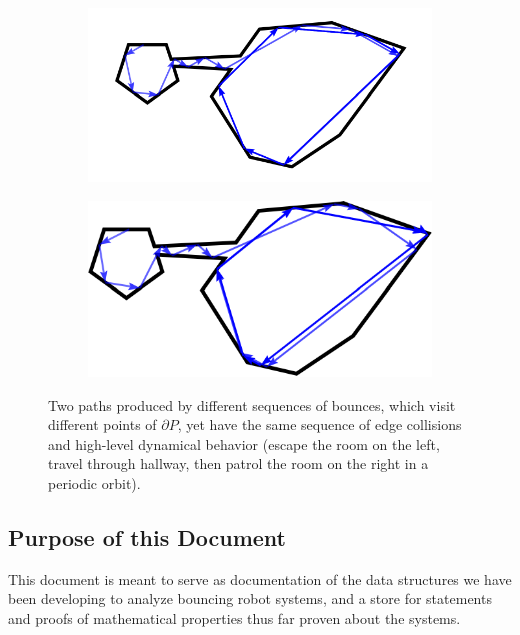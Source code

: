 \documentclass[sageh,times,Review]{sagej}
\begin{document}
\begin{figure}
\centering
\begin{subfigure}{0.5\columnwidth}
\includegraphics[width=\linewidth]{twoc_a_new.pdf}
\end{subfigure}%
\begin{subfigure}{0.5\columnwidth}
\includegraphics[width=\linewidth]{twoc_b}
\end{subfigure}
\caption{Two paths produced by different sequences of bounces, which visit
different points of $\partial P$, yet have the same sequence of edge collisions 
and high-level dynamical behavior (escape the room on the left, travel through hallway, then
patrol the room on the right in a periodic orbit).\label{fig:twopaths}}
\end{figure}


\subsection{Purpose of this Document}

This document is meant to serve as documentation of the data structures we have
been developing to analyze bouncing robot systems, and a store for 
statements and proofs of mathematical properties thus far proven about the
systems.
\end{document}
